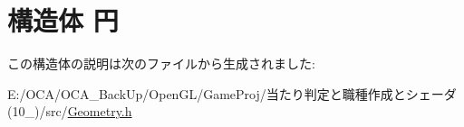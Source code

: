 \hypertarget{struct_xE5_x86_x86}{\section{構造体 円}
\label{struct_xE5_x86_x86}
}


この構造体の説明は次のファイルから生成されました\-:\begin{DoxyCompactItemize}
\item 
E\-:/\-O\-C\-A/\-O\-C\-A\-\_\-\-Back\-Up/\-Open\-G\-L/\-Game\-Proj/当たり判定と職種作成とシェーダ(10\-\_)/src/\hyperlink{_geometry_8h}{Geometry.\-h}\end{DoxyCompactItemize}

